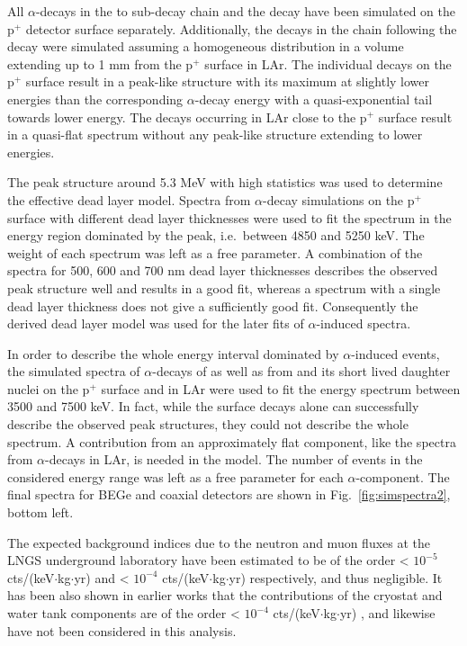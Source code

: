 All $\alpha$-decays in the  to  sub-decay chain and the  decay have been simulated on the p$^+$ detector surface separately. Additionally, the decays in the chain following the  decay were simulated assuming a homogeneous distribution in a volume extending up to 1 mm from the p$^+$ surface in LAr. The individual decays on the p$^+$ surface result in a peak-like structure with its maximum at slightly lower energies than the corresponding $\alpha$-decay energy with a quasi-exponential tail towards lower energy. The decays occurring in LAr close to the p$^+$ surface result in a quasi-flat spectrum without any peak-like structure extending to lower energies.

The  peak structure around 5.3 MeV with high statistics was used to determine the effective dead layer model. Spectra from  $\alpha$-decay simulations on the p$^+$ surface with different dead layer thicknesses were used to fit the spectrum in the energy region dominated by the  peak, i.e.~between 4850 and 5250 keV. The weight of each spectrum was left as a free parameter. A combination of the spectra for 500, 600 and 700 nm dead layer thicknesses describes the observed peak structure well and results in a good fit, whereas a spectrum with a single dead layer thickness does not give a sufficiently good fit. Consequently the derived dead layer model was used for the later fits of $\alpha$-induced spectra.

In order to describe the whole energy interval dominated by $\alpha$-induced events, the simulated spectra of $\alpha$-decays of  as well as from  and its short lived daughter nuclei on the p$^+$ surface and in LAr were used to fit the energy spectrum between 3500 and 7500 keV. In fact, while the surface decays alone can successfully describe the observed peak structures, they could not describe the whole spectrum. A contribution from an approximately flat component, like the spectra from $\alpha$-decays in LAr, is needed in the model. The number of events in the considered energy range was left as a free parameter for each $\alpha$-component. The final spectra for BEGe and coaxial detectors are shown in Fig.~\ref{fig:simspectra2}, bottom left.

 The expected background indices due to the neutron and muon fluxes at the LNGS underground laboratory have been estimated to be of the order < $10^{-5}$ cts/(keV$\cdot$kg$\cdot$yr) \cite{neutronsBI} and < $10^{-4}$ cts/(keV$\cdot$kg$\cdot$yr) \cite{muonsBI} respectively, and thus negligible. It has been also shown in earlier works that the contributions of the cryostat and water tank components are of the order < $10^{-4}$ cts/(keV$\cdot$kg$\cdot$yr) \cite{criowaterBI}, and likewise have not been considered in this analysis.

